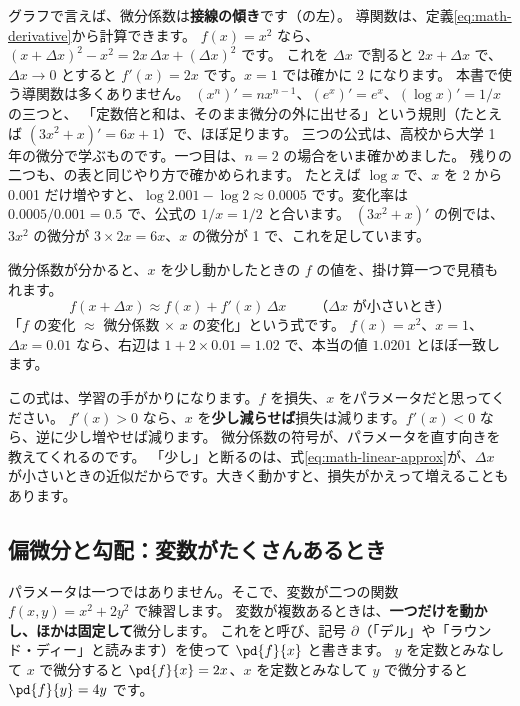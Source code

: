 グラフで言えば、微分係数は\textbf{接線の傾き}です（の左）。
導関数は、定義\eqref{eq:math-derivative}から計算できます。
$f(x)=x^{2}$ なら、$(x+\Delta x)^{2}-x^{2}=2x\,\Delta x+(\Delta x)^{2}$ です。
これを $\Delta x$ で割ると $2x+\Delta x$ で、$\Delta x\to 0$ とすると $f'(x)=2x$ です。$x=1$ では確かに 2 になります。
本書で使う導関数は多くありません。
$(x^{n})'=nx^{n-1}$、$(e^{x})'=e^{x}$、$(\log x)'=1/x$ の三つと、
「定数倍と和は、そのまま微分の外に出せる」という規則（たとえば $(3x^{2}+x)'=6x+1$）で、ほぼ足ります。
三つの公式は、高校から大学 1 年の微分で学ぶものです。一つ目は、$n=2$ の場合をいま確かめました。
残りの二つも、の表と同じやり方で確かめられます。
たとえば $\log x$ で、$x$ を 2 から 0.001 だけ増やすと、$\log 2.001-\log 2\approx 0.0005$ です。変化率は $0.0005/0.001=0.5$ で、公式の $1/x=1/2$ と合います。
$(3x^{2}+x)'$ の例では、$3x^{2}$ の微分が $3\times 2x=6x$、$x$ の微分が 1 で、これを足しています。

微分係数が分かると、$x$ を少し動かしたときの $f$ の値を、掛け算一つで見積もれます。
\begin{equation}
f(x+\Delta x)\approx f(x)+f'(x)\,\Delta x \qquad\text{（$\Delta x$ が小さいとき）}
\label{eq:math-linear-approx}
\end{equation}
「$f$ の変化 $\approx$ 微分係数 $\times$ $x$ の変化」という式です。
$f(x)=x^{2}$、$x=1$、$\Delta x=0.01$ なら、右辺は $1+2\times 0.01=1.02$ で、本当の値 $1.0201$ とほぼ一致します。

この式は、学習の手がかりになります。$f$ を損失、$x$ をパラメータだと思ってください。
$f'(x)>0$ なら、$x$ を\textbf{少し減らせば}損失は減ります。$f'(x)<0$ なら、逆に少し増やせば減ります。
微分係数の符号が、パラメータを直す向きを教えてくれるのです。
「少し」と断るのは、式\eqref{eq:math-linear-approx}が、$\Delta x$ が小さいときの近似だからです。大きく動かすと、損失がかえって増えることもあります。

\subsection*{偏微分と勾配：変数がたくさんあるとき}

パラメータは一つではありません。そこで、変数が二つの関数 $f(x,y)=x^{2}+2y^{2}$ で練習します。
変数が複数あるときは、\textbf{一つだけを動かし、ほかは固定して}微分します。
これをと呼び、記号 $\partial$（「デル」や「ラウンド・ディー」と読みます）を使って $\pd{f}{x}$ と書きます。
$y$ を定数とみなして $x$ で微分すると $\pd{f}{x}=2x$、$x$ を定数とみなして $y$ で微分すると $\pd{f}{y}=4y$ です。

